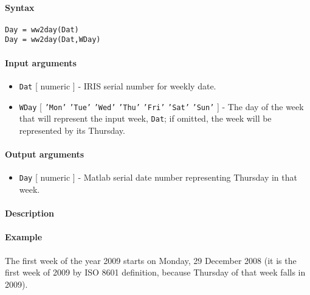 


	\paragraph{Syntax}\label{syntax}

\begin{verbatim}
Day = ww2day(Dat)
Day = ww2day(Dat,WDay)
\end{verbatim}

\paragraph{Input arguments}\label{input-arguments}

\begin{itemize}
\item
  \texttt{Dat} {[} numeric {]} - IRIS serial number for weekly date.
\item
  \texttt{WDay} {[} \texttt{'Mon'} \textbar{} \texttt{'Tue'} \textbar{}
  \texttt{'Wed'} \textbar{} \texttt{'Thu'} \textbar{} \texttt{'Fri'}
  \textbar{} \texttt{'Sat'} \textbar{} \texttt{'Sun'} {]} - The day of
  the week that will represent the input week, \texttt{Dat}; if omitted,
  the week will be represented by its Thursday.
\end{itemize}

\paragraph{Output arguments}\label{output-arguments}

\begin{itemize}
\itemsep1pt\parskip0pt
\item
  \texttt{Day} {[} numeric {]} - Matlab serial date number representing
  Thursday in that week.
\end{itemize}

\paragraph{Description}\label{description}

\paragraph{Example}\label{example}

The first week of the year 2009 starts on Monday, 29 December 2008 (it
is the first week of 2009 by ISO 8601 definition, because Thursday of
that week falls in 2009).

